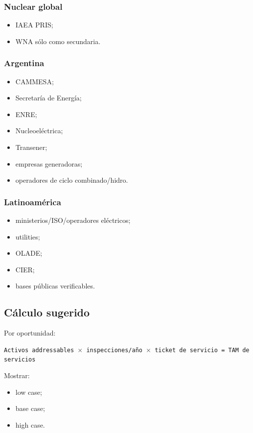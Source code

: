 \documentclass[11pt,a4paper]{article}
\begin{document}
\subsubsection*{Nuclear global}
\begin{itemize}
\item IAEA PRIS;
\item WNA sólo como secundaria.
\end{itemize}


\subsubsection*{Argentina}
\begin{itemize}
\item CAMMESA;
\item Secretaría de Energía;
\item ENRE;
\item Nucleoeléctrica;
\item Transener;
\item empresas generadoras;
\item operadores de ciclo combinado/hidro.
\end{itemize}


\subsubsection*{Latinoamérica}
\begin{itemize}
\item ministerios/ISO/operadores eléctricos;
\item utilities;
\item OLADE;
\item CIER;
\item bases públicas verificables.
\end{itemize}


\subsection*{Cálculo sugerido}
Por oportunidad:

\texttt{Activos addressables $\times$ inspecciones/año $\times$ ticket de servicio = TAM de servicios}

Mostrar:

\begin{itemize}
\item low case;
\item base case;
\item high case.
\end{itemize}
\end{document}
